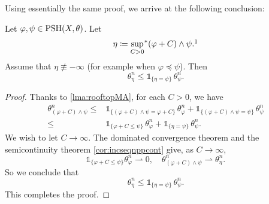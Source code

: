 Using essentially the same proof, we arrive at the following conclusion:
\begin{corollary}\label{cor:Pvarphisupport}
    Let $\varphi,\psi\in \mathrm{PSH}(X,\theta)$. Let
    \[
    \eta\coloneqq \uscsup[C>0] (\varphi+C)\land \psi.\footnotemark
    \]
    Assume that $\eta\not\equiv -\infty$ (for example when $\varphi\preceq \psi$).
    Then
    \[
    \theta_{\eta}^n\leq \mathds{1}_{\{\eta=\psi\}}\,\theta_{\psi}^n.
    \]
\end{corollary}
\begin{proof}
    Thanks to \cref{lma:rooftopMA}, for each $C>0$, we have
    \[
    \begin{aligned}
    \theta_{(\varphi+C)\land \psi}^n\leq & \mathds{1}_{\{(\varphi+C)\land \psi=\varphi+C\} }\, \theta_{\varphi}^n+\mathds{1}_{\{(\varphi+C)\land \psi=\psi\} }\, \theta_{\psi}^n\\
    \leq & \mathds{1}_{\{\varphi+C\leq \psi\} }\, \theta_{\varphi}^n+\mathds{1}_{\{\eta=\psi\} } \,\theta_{\psi}^n.
    \end{aligned}
    \]
    We wish to let $C\to\infty$.
    The dominated convergence theorem and the semicontinuity theorem \cref{cor:incseqnppcont} give, as $C\to\infty$,
    \[
    \mathds{1}_{\{\varphi+C\leq \psi\} } \theta_{\varphi}^n\rightharpoonup 0,\quad
    \theta_{(\varphi+C)\land \psi}^n\rightharpoonup \theta_{\eta}^n.
    \]
    So we conclude that
    \[
    \theta_{\eta}^n\leq \mathds{1}_{\{\eta=\psi\}} \,\theta_{\psi}^n.
    \]
    This completes the proof.
\end{proof}


